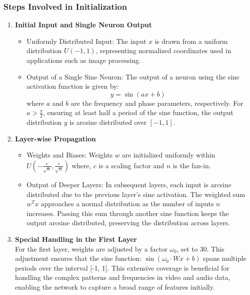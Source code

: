     \subsubsection{Steps Involved in Initialization}
    \begin{enumerate}[label=\textbf{\roman*.}]
        \item \textbf{Initial Input and Single Neuron Output}
        \begin{itemize}
            \item Uniformly Distributed Input: The input $x$ is drawn from a uniform distribution $U(-1, 1)$, representing normalized coordinates used in applications such as image processing.
            \item Output of a Single Sine Neuron: The output of a neuron using the sine activation function is given by:
               \begin{equation}
                  y = \sin(ax + b) 
               \end{equation} 
            where $a$ and $b$ are the frequency and phase parameters, respectively. For $a > \frac{\pi}{2}$, ensuring at least half a period of the sine function, the output distribution $y$ is arcsine distributed over $[-1, 1]$.
        \end{itemize}
        \item \textbf{Layer-wise Propagation}
        \begin{itemize}
            \item Weights and Biases: Weights $w$ are initialized uniformly within $U\left(-\frac{c}{\sqrt{n}}, \frac{c}{\sqrt{n}}\right)$ where, $c$ is a scaling factor and $n$ is the fan-in.
            \item Output of Deeper Layers: In subsequent layers, each input is arcsine distributed due to the previous layer's sine activation. The weighted sum $w^T x$ approaches a normal distribution as the number of inputs $n$ increases. Passing this sum through another sine function keeps the output arcsine distributed, preserving the distribution across layers.
        \end{itemize}
        \item \textbf{Special Handling in the First Layer} \\
          For the first layer, weights are adjusted by a factor $\omega_0$, set to 30. This adjustment ensures that the sine function: $\sin(\omega_0 \cdot Wx + b)$ spans multiple periods over the interval [-1, 1]. This extensive coverage is beneficial for handling the complex patterns and frequencies in video and audio data, enabling the network to capture a broad range of features initially.        
    \end{enumerate}


